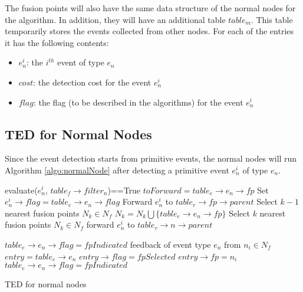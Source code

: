 The fusion points will also have the same data structure of the normal nodes for the algorithm. In addition, they will have an additional table \(table_m\). This table temporarily stores the events collected from other nodes. For each of the entries it has the following contents: 
\begin{itemize}
\item \(e^i_n\): the \(i^{th}\) event of type \(e_n\)
\item \(cost\): the detection cost for the event \(e^i_n\)
\item \(flag\): the flag (to be described in the algorithms) for the event \(e^i_n\)
\end{itemize}

\subsection{TED for Normal Nodes}
Since the event detection starts from primitive events, the normal nodes will run Algorithm \ref{algo:normalNode} after detecting a primitive event \(e^i_n\) of type \(e_n\).
\begin{algorithm}
\begin{algorithmic}
\REQUIRE evaluate(\(e^i_n\), \(table_f\rightarrow filter_n\))==True
		\STATE \(toForward=table_e\rightarrow e_n\rightarrow fp\)
		\STATE Set \(e^i_n\rightarrow flag=table_e\rightarrow e_n\rightarrow flag\)
		\STATE Forward \(e^i_n\) to \(table_r\rightarrow fp\rightarrow parent\)
	\ELSE
			\STATE Select \(k-1\) nearest fusion points \(N_k\in N_f\)
			\STATE \(N_k=N_k\bigcup \{table_e\rightarrow e_n\rightarrow fp\}\)
		\ELSE
			\STATE Select \(k\) nearest fusion points \(N_k\in N_f\)
		\ENDIF
			\STATE forward \(e^i_n\) to \(table_r\rightarrow n\rightarrow parent\)
		\ENDFOR
	\ENDIF
	
		\STATE \(table_e\rightarrow e_n\rightarrow flag=fpIndicated\)
	\ENDIF
\REQUIRE feedback of event type \(e_n\) from \(n_i\in N_f\)
	\STATE \(entry=table_e\rightarrow e_n\)
		\STATE \(entry\rightarrow flag=fpSelected\)
		\STATE \(entry\rightarrow fp=n_i\)
		\STATE \(table_e\rightarrow e_n\rightarrow flag=fpIndicated\)
	\ENDIF
\end{algorithmic}
\caption{TED for normal nodes}
\label{algo:normalNode}
\end{algorithm}
